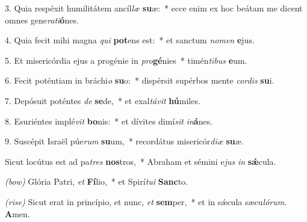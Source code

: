 3. Quia respéxit humilitátem ancíl\textit{læ} \textbf{su}æ:~* ecce enim ex hoc beátam me dicent omnes gene\textit{ra}\textit{ti}\textbf{ó}nes.

4. Quia fecit mihi magna \textit{qui} \textbf{pot}ens est:~* et sanctum \textit{no}\textit{men} \textbf{e}jus.

5. Et misericórdia ejus a progénie in \textit{pro}\textbf{gé}nies~* timén\textit{ti}\textit{bus} \textbf{e}um.

6. Fecit poténtiam in bráchi\textit{o} \textbf{su}o:~* dispérsit supérbos mente \textit{cor}\textit{dis} \textbf{su}i.

7. Depósuit poténtes \textit{de} \textbf{se}de,~* et exal\textit{tá}\textit{vit} \textbf{hú}miles.

8. Esuriéntes implé\textit{vit} \textbf{bo}nis:~* et dívites dimí\textit{sit} \textit{in}\textbf{á}nes.

9. Suscépit Israël púe\textit{rum} \textbf{su}um,~* recordátus misericór\textit{di}\textit{æ} \textbf{su}æ.

Sicut locútus est ad pa\textit{tres} \textbf{nos}tros,~* Abraham et sémini e\textit{jus} \textit{in} \textbf{s\'{\ae}}cula.

\textit{(bow)} Glória Patri, \textit{et} \textbf{Fí}lio,~* et Spirí\textit{tu}\textit{i} \textbf{Sanc}to.

\textit{(rise)} Sicut erat in princípio, et nunc, \textit{et} \textbf{sem}per,~* et in s\'{\ae}cula sæcu\textit{ló}\textit{rum}. \textbf{A}men.